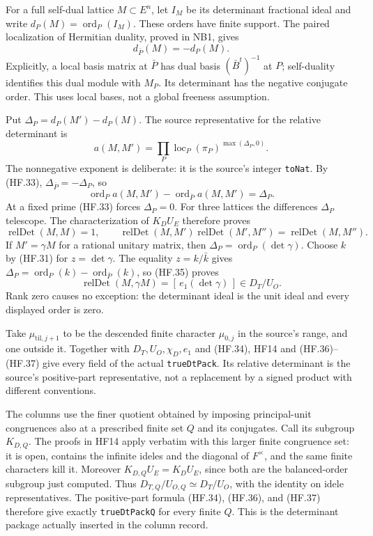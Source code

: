 For a full self-dual lattice $M\subset E^n$, let $I_M$
be its determinant fractional ideal and write
$d_P(M)=\operatorname{ord}_P(I_M)$.
These orders have finite support. The paired localization
of Hermitian duality, proved in NB1, gives
\[
                 d_{\bar P}(M)=-d_P(M).              \tag{HF.33}
\]
Explicitly, a local basis matrix at $\bar P$ has dual
basis $(\bar B^t)^{-1}$ at $P$; self-duality identifies
this dual module with $M_P$. Its determinant has
the negative conjugate order. This uses local bases,
not a global freeness assumption.

Put $\Delta_P=d_P(M')-d_P(M)$. The source representative
for the relative determinant is
\[
 a(M,M')=\prod_P
       \operatorname{loc}_P(\pi_P)^{\max(\Delta_P,0)}.
 \tag{HF.34}
\]
The nonnegative exponent is deliberate: it is the
source's integer \texttt{toNat}. By (HF.33),
$\Delta_{\bar P}=-\Delta_P$, so
\[
 \operatorname{ord}_P a(M,M')
       -\operatorname{ord}_{\bar P}a(M,M')=\Delta_P.
 \tag{HF.35}
\]
At a fixed prime (HF.33) forces $\Delta_P=0$.
For three lattices the differences $\Delta_P$
telescope. The characterization of $K_DU_E$ therefore
proves
\[
 \operatorname{relDet}(M,M)=1,\qquad
 \operatorname{relDet}(M,M')
   \operatorname{relDet}(M',M'')
                       =\operatorname{relDet}(M,M'').
 \tag{HF.36}
\]
If $M'=\gamma M$ for a rational unitary matrix, then
$\Delta_P=\operatorname{ord}_P(\det\gamma)$.
Choose $k$ by (HF.31) for $z=\det\gamma$.
The equality $z=k/\bar k$ gives
$\Delta_P=\operatorname{ord}_P(k)
-\operatorname{ord}_{\bar P}(k)$, so (HF.35) proves
\[
            \operatorname{relDet}(M,\gamma M)
                 =[\,e_1(\det\gamma)\,]\in D_T/U_O.
 \tag{HF.37}
\]
Rank zero causes no exception: the determinant ideal
is the unit ideal and every displayed order is zero.

Take $\mu_{\mathrm{til},j+1}$ to be the descended
finite character $\mu_{0,j}$ in the source's range,
and one outside it. Together with $D_T,U_O,\chi_D,e_1$
and (HF.34), HF14 and (HF.36)--(HF.37) give every
field of the actual \texttt{trueDtPack}. Its relative
determinant is the source's positive-part representative,
not a replacement by a signed product with different
conventions.

The columns use the finer quotient obtained by imposing
principal-unit congruences also at a prescribed finite
set $Q$ and its conjugates. Call its subgroup $K_{D,Q}$.
The proofs in HF14 apply verbatim with this larger finite
congruence set: it is open, contains the infinite ideles
and the diagonal of $F^\times$, and the same finite
characters kill it. Moreover
$K_{D,Q}U_E=K_DU_E$, since both are the balanced-order
subgroup just computed. Thus
$D_{T,Q}/U_{O,Q}\simeq D_T/U_O$, with the identity on
idele representatives. The positive-part formula
(HF.34), (HF.36), and (HF.37) therefore give exactly
\texttt{trueDtPackQ} for every finite $Q$.
This is the determinant package actually inserted in
the column record.

